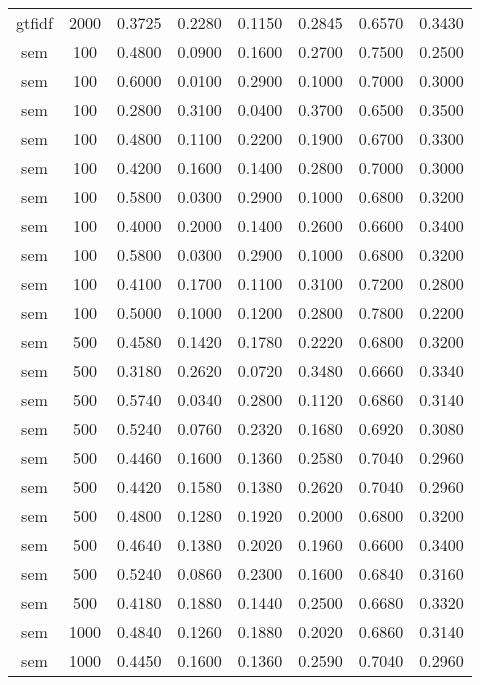 \begin{table}[h!]
\begin{tabularx}{\textwidth}{cccccccc}
		gtfidf   & 2000 & 0.3725 & 0.2280 & 0.1150 & 0.2845 & 0.6570 & 0.3430 \\
		sem      & 100  & 0.4800 & 0.0900 & 0.1600 & 0.2700 & 0.7500 & 0.2500 \\
		sem      & 100  & 0.6000 & 0.0100 & 0.2900 & 0.1000 & 0.7000 & 0.3000 \\
		sem      & 100  & 0.2800 & 0.3100 & 0.0400 & 0.3700 & 0.6500 & 0.3500 \\
		sem      & 100  & 0.4800 & 0.1100 & 0.2200 & 0.1900 & 0.6700 & 0.3300 \\
		sem      & 100  & 0.4200 & 0.1600 & 0.1400 & 0.2800 & 0.7000 & 0.3000 \\
		sem      & 100  & 0.5800 & 0.0300 & 0.2900 & 0.1000 & 0.6800 & 0.3200 \\
		sem      & 100  & 0.4000 & 0.2000 & 0.1400 & 0.2600 & 0.6600 & 0.3400 \\
		sem      & 100  & 0.5800 & 0.0300 & 0.2900 & 0.1000 & 0.6800 & 0.3200 \\
		sem      & 100  & 0.4100 & 0.1700 & 0.1100 & 0.3100 & 0.7200 & 0.2800 \\
		sem      & 100  & 0.5000 & 0.1000 & 0.1200 & 0.2800 & 0.7800 & 0.2200 \\
		sem      & 500  & 0.4580 & 0.1420 & 0.1780 & 0.2220 & 0.6800 & 0.3200 \\
		sem      & 500  & 0.3180 & 0.2620 & 0.0720 & 0.3480 & 0.6660 & 0.3340 \\
		sem      & 500  & 0.5740 & 0.0340 & 0.2800 & 0.1120 & 0.6860 & 0.3140 \\
		sem      & 500  & 0.5240 & 0.0760 & 0.2320 & 0.1680 & 0.6920 & 0.3080 \\
		sem      & 500  & 0.4460 & 0.1600 & 0.1360 & 0.2580 & 0.7040 & 0.2960 \\
		sem      & 500  & 0.4420 & 0.1580 & 0.1380 & 0.2620 & 0.7040 & 0.2960 \\
		sem      & 500  & 0.4800 & 0.1280 & 0.1920 & 0.2000 & 0.6800 & 0.3200 \\
		sem      & 500  & 0.4640 & 0.1380 & 0.2020 & 0.1960 & 0.6600 & 0.3400 \\
		sem      & 500  & 0.5240 & 0.0860 & 0.2300 & 0.1600 & 0.6840 & 0.3160 \\
		sem      & 500  & 0.4180 & 0.1880 & 0.1440 & 0.2500 & 0.6680 & 0.3320 \\
		sem      & 1000 & 0.4840 & 0.1260 & 0.1880 & 0.2020 & 0.6860 & 0.3140 \\
		sem      & 1000 & 0.4450 & 0.1600 & 0.1360 & 0.2590 & 0.7040 & 0.2960 \\

\end{tabularx}
\end{table}
